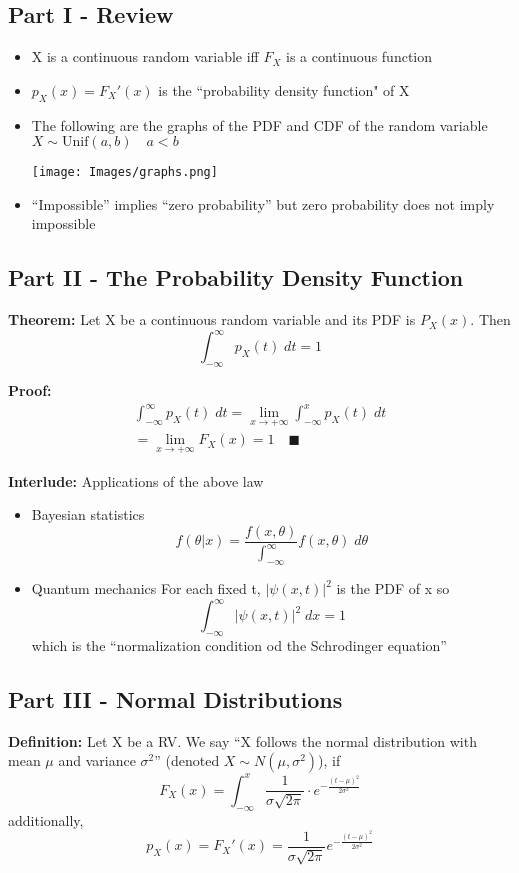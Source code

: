 \documentclass[12pt]{article}
\begin{document}
\subsection*{Part I - Review} 
\begin{itemize}
    \item X is a continuous random variable iff $F_X$ is a continuous function 
    \item $p_X(x) = F_X'(x)$ is the ``probability density function" of X 
    \item The following are the graphs of the PDF and CDF of the random variable $X \sim \text{Unif}(a, b)\quad a < b$
    
    \texttt{[image: Images/graphs.png]}

    \item ``Impossible'' implies ``zero probability'' but zero probability does not imply impossible
\end{itemize}

\subsection*{Part II - The Probability Density Function}
\textbf{Theorem:} Let X be a continuous random variable and its PDF is $P_X(x)$. Then
\[\int_{-\infty}^\infty p_X(t) \; dt = 1\]

\textbf{Proof:}
\begin{align*}
    \int_{-\infty}^\infty p_X(t) \; dt = \lim_{x \to +\infty} \int_{-\infty}^x p_X(t)\; dt\\
    = \lim_{x \to +\infty} F_X(x) = 1 \quad \blacksquare
\end{align*}

\textbf{Interlude:} Applications of the above law 
\begin{itemize}
    \item Bayesian statistics
    \[f(\theta | x) = \frac{f(x, \theta)}{\int_{-\infty}^\infty} f(x, \theta) \; d\theta\]
    \item Quantum mechanics
    For each fixed t, $|\psi(x, t)|^2$ is the PDF of x so 
    \[\int_{-\infty}^\infty |\psi(x, t)|^2 \; dx = 1\]
    which is the ``normalization condition od the Schrodinger equation''
\end{itemize}

\subsection*{Part III - Normal Distributions}
\textbf{Definition:} Let X be a RV. We say ``X follows the normal distribution with mean $\mu$ and variance $\sigma^2$'' (denoted $X \sim N(\mu, \sigma^2)$), if 
\[F_X(x) = \int_{-\infty}^x \frac{1}{\sigma \sqrt{2\pi}} \cdot e^{-\frac{(t - \mu)^2}{2\sigma^2}}\]
additionally, 
\[p_X(x) = F_X'(x) = \frac{1}{\sigma \sqrt{2\pi}} e^{-\frac{(t - \mu)^2}{2\sigma^2}}\]
\end{document}
